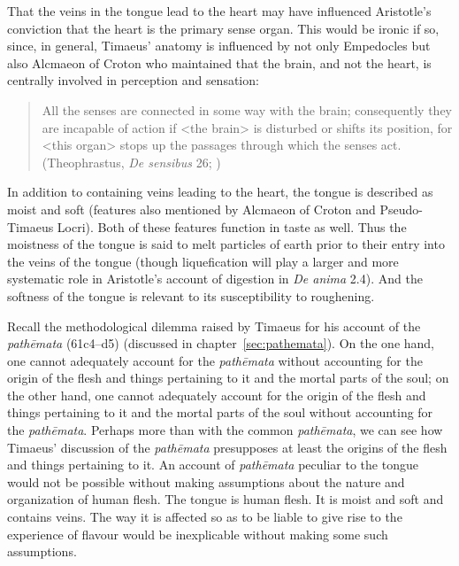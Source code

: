 That the veins in the tongue lead to the heart may have influenced Aristotle's conviction that the heart is the primary sense organ. This would be ironic if so, since, in general, Timaeus' anatomy is influenced by not only Empedocles but also Alcmaeon of Croton who maintained that the brain, and not the heart, is centrally involved in perception and sensation:
\begin{quote}
	All the senses are connected in some way with the brain; consequently they are incapable of action if <the brain> is disturbed or shifts its position, for <this organ> stops up the passages through which the senses act. (Theophrastus, \emph{De sensibus} 26; \citealt[89--91]{Stratton:1917vn})
\end{quote}

In addition to containing veins leading to the heart, the tongue is described as moist and soft (features also mentioned by Alcmaeon of Croton and Pseudo-Timaeus Locri). Both of these features function in taste as well. Thus the moistness of the tongue is said to melt particles of earth prior to their entry into the veins of the tongue (though liquefication will play a larger and more systematic role in Aristotle's account of digestion in \emph{De anima} 2.4). And the softness of the tongue is relevant to its susceptibility to roughening.

Recall the methodological dilemma raised by Timaeus for his account of the \emph{pathēmata} (61c4–d5) (discussed in chapter~\ref{sec:pathemata}). On the one hand, one cannot adequately account for the \emph{pathēmata} without accounting for the origin of the flesh and things pertaining to it and the mortal parts of the soul; on the other hand, one cannot adequately account for the origin of the flesh and things pertaining to it and the mortal parts of the soul without accounting for the \emph{pathēmata}. Perhaps more than with the common \emph{pathēmata}, we can see how Timaeus' discussion of the \emph{pathēmata} presupposes at least the origins of the flesh and things pertaining to it. An account of \emph{pathēmata} peculiar to the tongue would not be possible without making assumptions about the nature and organization of human flesh. The tongue is human flesh. It is moist and soft and contains veins. The way it is affected so as to be liable to give rise to the experience of flavour would be inexplicable without making some such assumptions.

